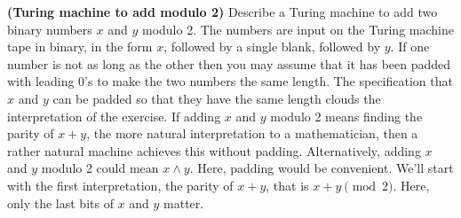  \textbf{(Turing machine to add modulo 2)} Describe a Turing machine to add two binary numbers $x$ and $y$ modulo 2.  The numbers are input on the Turing machine tape in binary, in the form $x$, followed by a single blank, followed by $y$.  If one number is not as long as the other then you may assume that it has been padded with leading 0's to make the two numbers the same length.
\Soln The specification that $x$ and $y$ can be padded so that they have the same length clouds the interpretation of the exercise.   If adding $x$ and $y$ modulo 2 means finding the parity of $x+y$, the more natural interpretation to a mathematician, then a rather natural machine achieves this without padding.  Alternatively, adding $x$ and $y$ modulo 2 could mean $x\wedge y$.  Here, padding would be convenient.  We'll start with the first interpretation, the parity of $x+y$, that is $x+y\pmod{2}$. Here, only the last bits of $x$ and $y$ matter.

